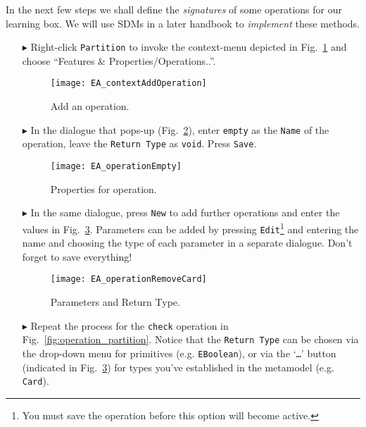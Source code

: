 In the next few steps we shall define the \emph{signatures} of some operations for our learning box.
We will use SDMs in a later handbook to \emph{implement} these methods.
\begin{enumerate}
\item[$\blacktriangleright$] Right-click \texttt{Partition} to invoke the context-menu depicted in Fig.~\ref{fig:add_operation} and choose ``Features \& Properties/Operations..''.

\begin{figure}[htbp]
	\centering
  \texttt{[image: EA\_contextAddOperation]}
	\caption{Add an operation.}
	\label{fig:add_operation}
\end{figure}
\FloatBarrier

\item[$\blacktriangleright$] In the dialogue that pops-up (Fig.~\ref{fig:operation_properties}), enter \texttt{empty} as the \texttt{Name} of the operation, leave the \texttt{Return Type} as \texttt{void}.  Press \texttt{Save}.

\begin{figure}[htbp]
	\centering
  	\texttt{[image: EA\_operationEmpty]}
	\caption{Properties for operation.}
	\label{fig:operation_properties}
\end{figure}
\FloatBarrier

\item[$\blacktriangleright$] In the same dialogue, press \texttt{New} to add further operations and enter the values in Fig.~\ref{fig:operation_parameters}.  Parameters can be added by pressing \texttt{Edit}\footnote{You must save the operation before this option will become active.} and entering the name and choosing the type of each parameter in a separate dialogue. Don't forget to save everything!

\begin{figure}[htbp]
	\centering
  \texttt{[image: EA\_operationRemoveCard]}
	\caption{Parameters and Return Type.}
	\label{fig:operation_parameters}
\end{figure}
\FloatBarrier

\item[$\blacktriangleright$] Repeat the process for the \texttt{check} operation in Fig.~\ref{fig:operation_partition}.
Notice that the \texttt{Return Type} can be chosen via the drop-down menu for primitives (e.g. \texttt{EBoolean}), or via the `\texttt{\ldots}' button (indicated in Fig.~\ref{fig:operation_parameters}) for types you've established in the metamodel (e.g. \texttt{Card}).
\end{enumerate}

